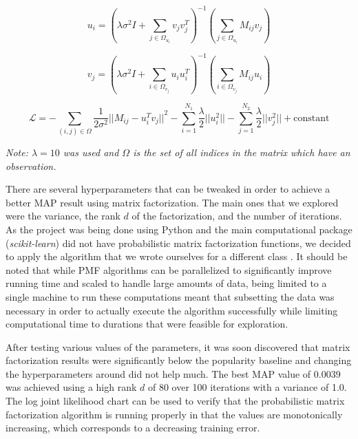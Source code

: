 \documentclass[11pt,preprint]{aastex}
\newcommand{\TRANSPOSE}{\ensuremath{T}}
\begin{document}
\begin{equation}
u_i = \left( \lambda\sigma^2 I + \sum_{j \in \Omega_{u_i}} v_j v_j^\TRANSPOSE \right)^{-1}\left(\sum_{j \in \Omega_{u_i}} M_{ij} v_{j} \right)
\label{eq1}
\end{equation}

\begin{equation}
v_j = \left( \lambda\sigma^2 I + \sum_{i \in \Omega_{v_j}} u_i u_i^\TRANSPOSE  \right)^{-1}\left(\sum_{i \in \Omega_{v_j}} M_{ij} u_{i} \right)
\label{eq2}
\end{equation}

\begin{equation}
\mathcal{L} = - \sum_{(i,j) \in \Omega} \frac{1}{2\sigma^2} {|| M_{ij} - u_i^\TRANSPOSE  v_j||}^2 - \sum_{i=1}^{N_1} \frac{\lambda}{2} ||u_i^2 || - \sum_{j=1}^{N_2} \frac{\lambda}{2} ||v_j^2 || + \text{constant}
\label{eq3} 
\end{equation}

\emph{Note: $\lambda = 10$ was used and $\Omega$ is the set of all indices in the matrix which have an observation.}

There are several hyperparameters that can be tweaked in order to achieve a better MAP result using matrix factorization. The main ones that we explored were the variance, the rank $d$ of the factorization, and the number of iterations. As the project was being done using Python and the main computational package (\emph{scikit-learn}) did not have probabilistic matrix factorization functions, we decided to apply the algorithm that we wrote ourselves for a different class \citep{koren2009matrix}. It should be noted that while PMF algorithms can be parallelized to significantly improve running time and scaled to handle large amounts of data, being limited to a single machine to run these computations meant that subsetting the data was necessary in order to actually execute the algorithm successfully while limiting computational time to durations that were feasible for exploration.
 
After testing various values of the parameters, it was soon discovered that matrix factorization results were significantly below the popularity baseline and changing the hyperparameters around did not help much. The best MAP value of 0.0039 was achieved using a high rank $d$ of 80 over 100 iterations with a variance of 1.0. The log joint likelihood chart can be used to verify that the probabilistic matrix factorization algorithm is running properly in that the values are monotonically increasing, which corresponds to a decreasing training error. 
\end{document}
